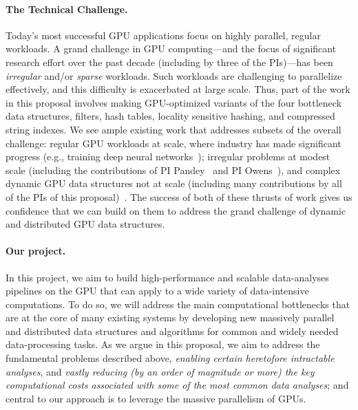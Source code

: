 \paragraph{The Technical Challenge.} Today's most successful GPU applications focus on
highly parallel, regular workloads. 
A grand challenge in GPU computing---and the focus of significant research effort over the past decade (including by three of the PIs)---has been
\emph{irregular} and/or \emph{sparse} workloads. 
Such workloads are challenging to parallelize
effectively, and this difficulty is exacerbated at large scale.
Thus, part of the work in this proposal involves making GPU-optimized variants of  the four bottleneck data structures, filters, hash tables, locality sensitive hashing, and compressed string indexes.
We see ample existing work
that addresses subsets of the overall challenge: regular GPU workloads at
scale, where industry has made significant progress (e.g., training deep neural networks~\cite{Dubey:2024:TL3}); irregular problems at modest scale (including the contributions of PI Pandey~\cite{DBLP:conf/ipps/NisaPEOBY21,DBLP:conf/ppopp/McCoyHY023} and PI Owens~\cite{Pan:2017:MGA,Chen:2022:SIP}), and complex dynamic GPU data
structures not at scale (including many contributions by all of the PIs of this
proposal)~\cite{Ashkiani:2018:ADH,Awad:2019:EAH,Junger:2020:WAL,Li:2021:DDH,mccoy2022high,Zhou:2021:DAD}.
The success of both of these thrusts of work gives us confidence
that we can build on them to address the grand challenge of dynamic and
distributed GPU data structures.






\paragraph{Our project.} In this project, we aim to build high-performance and scalable
data-analyses pipelines on the GPU that can apply to a wide variety of data-intensive
computations.  To do so, we will address the main computational
bottlenecks that are at the core of many existing systems by developing new
massively parallel and distributed data structures and algorithms for common
and widely needed data-processing tasks. 
As we argue in this proposal, we aim to address the fundamental problems described above, \emph{enabling certain heretofore intractable analyses}, and \emph{vastly reducing (by an order of magnitude or more) the key computational costs associated with some of the most common data analyses}; and
central to our approach is to leverage the massive parallelism of GPUs. 

